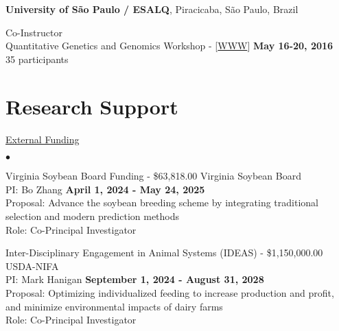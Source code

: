 \documentclass[margin,line,10pt]{res}
\newenvironment{list2}{
  \begin{list}{$\bullet$}{%
      \setlength{\itemsep}{0in}
      \setlength{\parsep}{0in} \setlength{\parskip}{0in}
      \setlength{\topsep}{0in} \setlength{\partopsep}{0in} 
      \setlength{\leftmargin}{0.2in}}}{\end{list}}
\begin{document}
\begin{resume}
\section{}


{\bf University of S\~{a}o Paulo / ESALQ}, Piracicaba, S\~{a}o Paulo, Brazil
\vspace{.01pt}


Co-Instructor  \\
Quantitative Genetics and Genomics Workshop - [\textcolor{blue}{\href{http://morotalab.org/ESALQ2016/ESALQ2016.html}{WWW}}]
\hfill {\bf May 16-20, 2016} \\
35 participants  






\vspace{0.5cm}
\section{\sc Research Support}
\begin{flushleft}
\hspace{0.2cm} \underline{External Funding}
\end{flushleft}

\begin{list2}

  \item Virginia Soybean Board Funding  - \$63,818.00  \hfill Virginia Soybean Board \\
  PI: Bo Zhang  \hfill \textbf{April 1, 2024 - May 24, 2025}\\
Proposal: Advance the soybean breeding scheme by integrating traditional selection and modern prediction methods\\
Role: Co-Principal Investigator \\

\vspace{0.5cm}

 \item Inter-Disciplinary Engagement in Animal Systems (IDEAS)  - \$1,150,000.00  \hfill USDA-NIFA \\
 PI: Mark Hanigan  \hfill \textbf{September 1, 2024 - August 31, 2028}\\
 Proposal: Optimizing individualized feeding to increase production and profit, and minimize environmental impacts of dairy farms \\
 Role: Co-Principal Investigator \\

\vspace{0.5cm}



\end{list2}
\end{resume}
\end{document}
